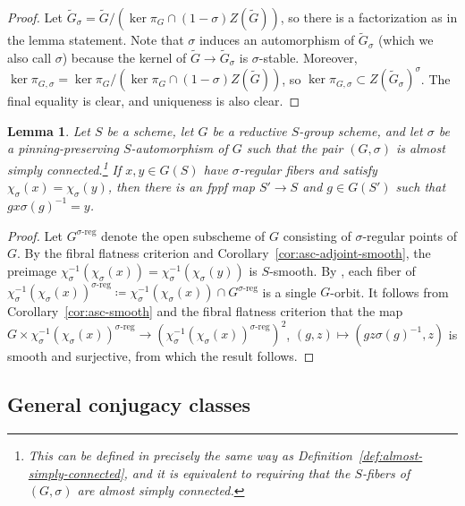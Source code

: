 \documentclass[11pt,reqno]{amsart}
\newtheorem{lemma}[theorem]{Lemma}
\theoremstyle{definition}
\begin{document}
\begin{proof}
    Let $\widetilde{G}_\sigma = \widetilde{G}/(\ker \pi_G \cap (1-\sigma)Z(\widetilde{G}))$, so there is a factorization as in the lemma statement. Note that $\sigma$ induces an automorphism of $\widetilde{G}_\sigma$ (which we also call $\sigma$) because the kernel of $\widetilde{G} \to \widetilde{G}_\sigma$ is $\sigma$-stable. Moreover, $\ker \pi_{G,\sigma} = \ker \pi_G/(\ker \pi_G \cap (1-\sigma)Z(\widetilde{G}))$, so $\ker \pi_{G,\sigma} \subset Z(\widetilde{G}_\sigma)^\sigma$. The final equality is clear, and uniqueness is also clear.
\end{proof}

\begin{lemma}\label{lemma:transp-fppf}
    Let $S$ be a scheme, let $G$ be a reductive $S$-group scheme, and let $\sigma$ be a pinning-preserving $S$-automorphism of $G$ such that the pair $(G, \sigma)$ is almost simply connected.\footnote{This can be defined in precisely the same way as Definition~\ref{def:almost-simply-connected}, and it is equivalent to requiring that the $S$-fibers of $(G, \sigma)$ are almost simply connected.} If $x, y \in G(S)$ have $\sigma$-regular fibers and satisfy $\chi_\sigma(x) = \chi_\sigma(y)$, then there is an fppf map $S' \to S$ and $g \in G(S')$ such that $gx\sigma(g)^{-1} = y$.
\end{lemma}

\begin{proof}
    Let $G^{\sigma\textrm{-reg}}$ denote the open subscheme of $G$ consisting of $\sigma$-regular points of $G$. By the fibral flatness criterion and Corollary~\ref{cor:asc-adjoint-smooth}, the preimage $\chi_\sigma^{-1}(\chi_\sigma(x)) = \chi_\sigma^{-1}(\chi_\sigma(y))$ is $S$-smooth. By \cite[Corollary 5.3.5(1)]{Xiao-Zhu}, each fiber of $\chi_\sigma^{-1}(\chi_\sigma(x))^{\sigma\textrm{-reg}} \coloneqq \chi_\sigma^{-1}(\chi_\sigma(x)) \cap G^{\sigma\textrm{-reg}}$ is a single $G$-orbit. It follows from Corollary~\ref{cor:asc-smooth} and the fibral flatness criterion that the map $G \times \chi_\sigma^{-1}(\chi_\sigma(x))^{\sigma\textrm{-reg}} \to (\chi_\sigma^{-1}(\chi_\sigma(x))^{\sigma\textrm{-reg}})^2$, $(g, z) \mapsto (gz\sigma(g)^{-1}, z)$ is smooth and surjective, from which the result follows.
\end{proof}






\subsection{General conjugacy classes}\label{ss:general-conj}
\end{document}
